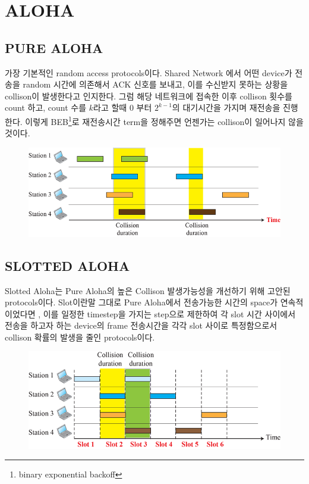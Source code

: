 \vspace{-3mm}
\section{ALOHA}
\vspace{-1mm}
\subsection{PURE ALOHA}
가장 기본적인 random access protocols이다. Shared Network 에서 어떤 device가 전송을 random 시간에 의존해서 ACK 신호를 보내고, 이를 수신받지 못하는 상황을 collison이 발생한다고 인지한다. 그럼 해당 네트워크에 접속한 이후  collison 횟수를 count 하고, count 수를 $k$라고 할때 0 부터 $2^{k-1}$의 대기시간을 가지며 재전송을 진행한다.  이렇게 BEB\footnote{binary exponential backoff}로 재전송시간 term을 정해주면 언젠가는 collison이 일어나지 않을것이다. \\
\vspace{-4mm}  
    \begin{figure}[!h]\centering
		\includegraphics[width=.66\textwidth]{image/week12/1-1.png}
		\vspace{-10pt}
    \end{figure}
\vspace{-4mm}

\subsection{SLOTTED ALOHA}
Slotted Aloha는 Pure Aloha의 높은 Collison 발생가능성을 개선하기 위해 고안된 protocols이다. Slot이란말 그대로 Pure Aloha에서 전송가능한 시간의 space가 연속적이었다면 , 이를 일정한 timestep을 가지는 step으로 제한하여 각 slot 시간 사이에서 전송을 하고자 하는 device의 frame 전송시간을 각각 slot 사이로 특정함으로서 collison 확률의 발생을 줄인 protocols이다.
\vspace{-4mm}  
    \begin{figure}[!h]\centering
		\includegraphics[width=.66\textwidth]{image/week12/1-2.png}
		\vspace{-10pt}
    \end{figure}
\clearpage
